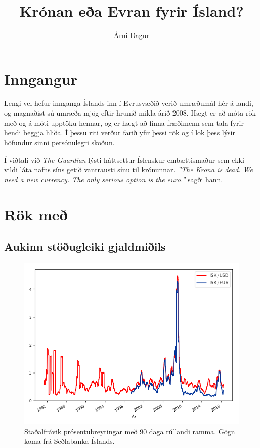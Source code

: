 \documentclass[a4paper]{article}
\title{Krónan eða Evran fyrir Ísland?}
\author{Árni Dagur}
\begin{document}
\maketitle

\section{Inngangur}

Lengi vel hefur innganga Íslands inn í Evrusvæðið verið umræðumál hér á landi, og magnaðist sú umræða mjög eftir hrunið mikla árið 2008. Hægt er að móta rök með og á móti upptöku hennar, og er hægt að finna fræðimenn sem tala fyrir hendi beggja hliða. Í þessu riti verður farið yfir þessi rök og í lok þess lýsir höfundur sinni persónulegri skoðun.

Í viðtali við \textit{The Guardian} lýsti háttsettur Íslenskur embættismaður sem ekki vildi láta nafns síns getið vantrausti sínu til krónunnar. \textit{''The Krona is dead. We need a new currency. The only serious option is the euro.''} sagði hann.\cite{traynor_2009}

\section{Rök með}

\subsection{Aukinn stöðugleiki gjaldmiðils}
\begin{figure} %
    \centerline{
        \includegraphics{volatility.png}
    }
    \caption{Staðalfrávik prósentubreytingar með 90 daga rúllandi ramma. Gögn koma frá Seðlabanka Íslands.}
    \label{fig:volatility}
\end{figure} %
\end{document}
